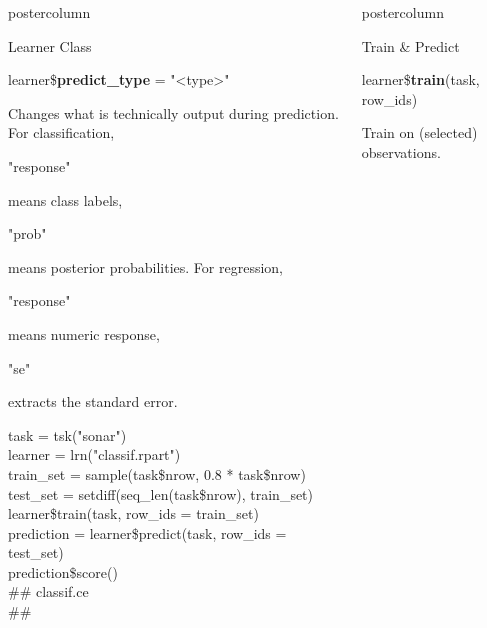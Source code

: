 \documentclass{beamer}
\newlength{\columnheight} %
\newcommand{\codeinline}[1]{\begin{codeboxinline}#1\end{codeboxinline}}
\begin{document}
\begin{frame}[fragile]{}
\begin{columns}
\begin{column}{.245\textwidth}
\begin{beamercolorbox}[center]{postercolumn}
\begin{minipage}{.98\textwidth}
{\begin{myblock}{Learner Class}
\begin{codebox}
								learner\$\textbf{predict\_type} = "<type>"
							\end{codebox}
							Changes what is technically output during prediction. For classification, 
	                        \codeinline{"response"} means class labels, \codeinline{"prob"} means posterior probabilities.
	                        For regression, \codeinline{"response"} means numeric response, 
	                        \codeinline{"se"} extracts the standard error.
							\vspace{1em}
							\begin{codeboxexample}
								{\scriptsize
									task = tsk("sonar")\\
									learner = lrn("classif.rpart")
									\vspace{1em}
									\\
									train\_set = sample(task\$nrow, 0.8 * task\$nrow)\\
									test\_set = setdiff(seq\_len(task\$nrow), train\_set)
									\vspace{1em}
									\\
									learner\$train(task, row\_ids = train\_set)
									\vspace{1em}
									\\
									prediction = learner\$predict(task, row\_ids = test\_set)\\
									prediction\$score()\\
									\#\# classif.ce\\
									\#\# }
							\end{codeboxexample}
						\end{myblock}
					\vfill}
				\end{minipage}
			\end{beamercolorbox}
		\end{column}
		\begin{column}{.245\textwidth}
			\begin{beamercolorbox}[center]{postercolumn}
				\begin{minipage}{.98\textwidth}
					\parbox[t][\columnheight]{\textwidth}{
						\begin{myblock}{Train \& Predict}
							\vspace{0.25em}
							\begin{codebox}
								learner\$\textbf{train}(task, row\_ids)
							\end{codebox}
	                        Train on (selected) observations. 
	   						\\

\end{myblock}}
\end{minipage}
\end{beamercolorbox}
\end{column}
\end{columns}
\end{frame}
\end{document}
